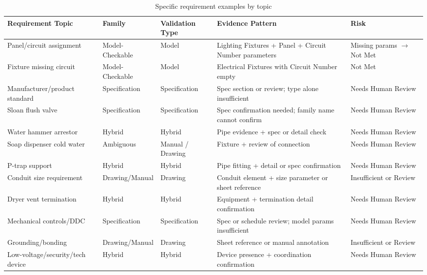 \documentclass[10pt,letterpaper]{article}
\begin{document}
\vspace{4pt}

\begin{longtable}{p{1.4in}p{1.3in}p{1.1in}p{1.3in}p{1.3in}}
\caption{Specific requirement examples by topic\label{tab:req-examples}}\\
\toprule
\textbf{Requirement Topic} & \textbf{Family} & \textbf{Validation Type} & \textbf{Evidence Pattern} & \textbf{Risk} \\
\midrule
\endhead
Panel/circuit assignment & Model-Checkable & Model & Lighting Fixtures + Panel + Circuit Number
  parameters & Missing params $\rightarrow$ Not Met \\
Fixture missing circuit & Model-Checkable & Model & Electrical Fixtures with Circuit Number empty
  & Not Met \\
Manufacturer/product standard & Specification & Specification & Spec section or review;
  type alone insufficient & Needs Human Review \\
Sloan flush valve & Specification & Specification & Spec confirmation needed;
  family name cannot confirm & Needs Human Review \\
Water hammer arrestor & Hybrid & Hybrid & Pipe evidence + spec or detail check
  & Needs Human Review \\
Soap dispenser cold water & Ambiguous & Manual / Drawing & Fixture + review of connection
  & Needs Human Review \\
P-trap support & Hybrid & Hybrid & Pipe fitting + detail or spec confirmation
  & Needs Human Review \\
Conduit size requirement & Drawing/Manual & Drawing & Conduit element + size parameter or sheet
  reference & Insufficient or Review \\
Dryer vent termination & Hybrid & Hybrid & Equipment + termination detail confirmation
  & Needs Human Review \\
Mechanical controls/DDC & Specification & Specification & Spec or schedule review;
  model params insufficient & Needs Human Review \\
Grounding/bonding & Drawing/Manual & Drawing & Sheet reference or manual annotation
  & Insufficient or Review \\
Low-voltage/security/tech device & Hybrid & Hybrid & Device presence +
  coordination confirmation & Needs Human Review \\
\bottomrule
\end{longtable}

\end{document}
